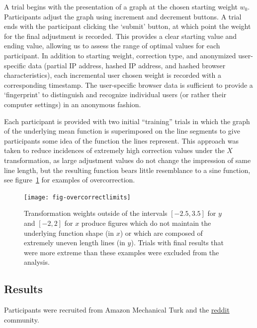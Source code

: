 \documentclass[11pt]{isuthesis}\usepackage[]{graphicx}\usepackage[]{color}
\begin{document}
A trial begins with the presentation of a graph at the chosen starting weight $w_0$. Participants adjust the graph using increment and decrement buttons. A trial ends with the participant clicking the `submit' button, at which point the weight for the final adjustment is recorded. This provides a clear starting value and ending value, allowing us to assess the range of optimal values for each participant. In addition to starting weight, correction type, and anonymized user-specific data (partial IP address, hashed IP address, and hashed browser characteristics), each incremental user chosen weight is recorded with a corresponding timestamp. The user-specific browser data is sufficient to provide a `fingerprint' to distinguish and recognize individual users (or rather their computer settings) in an anonymous fashion. 

Each participant is provided with two initial ``training'' trials in which the  graph of the underlying mean function is superimposed on the line segments to give participants some idea of the  function the lines represent. This approach was taken to reduce  incidences of extremely high  correction values under the $X$ transformation, as large adjustment values do not change the impression of same line length, but the resulting function bears little resemblance to a sine function, see figure~\ref{fig:overtransform} for examples of overcorrection.




\begin{figure}\centering
\texttt{[image: fig-overcorrectlimits]}
\caption[ Overcorrected transformations excluded from the analysis]{Transformation weights outside of the intervals $[\ensuremath{-2.5}, 3.5]$ for $y$ and $[\ensuremath{-2}, 2]$ for $x$  produce figures which do not maintain the underlying function shape (in $x$) or which are composed of extremely uneven length lines (in $y$). Trials with final results that were more extreme than these examples were excluded from the analysis.}
\label{fig:overtransform}
\end{figure}

\subsection{Results}

Participants were recruited from Amazon Mechanical Turk and the \href{http://reddit.com/r/SampleSize}{reddit} community.
\end{document}

